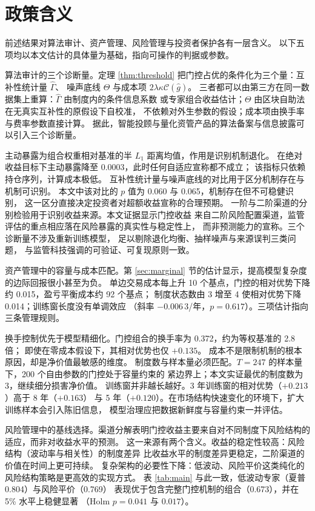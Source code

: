 \section{政策含义}
\label{sec:policy}

前述结果对算法审计、资产管理、风险管理与投资者保护各有一层含义。
以下五项均以本文估计的具体量为基础，指向可操作的判据或参数。

算法审计的三个诊断量。定理 \ref{thm:threshold} 把门控占优的条件化为三个量：互补性统计量 $\hat\Gamma$、
噪声底线 $\Theta$ 与成本项 $2\lambda\kappa\mathcal{C}(\hat g)$。
三者都可以由第三方在同一数据集上重算：$\hat\Gamma$ 由制度内的条件信息系数
或专家组合收益估计；$\Theta$ 由区块自助法在无真实互补性的原假设下自校准，
不依赖对外生参数的假设；成本项由换手率与费率参数直接计算。
据此，智能投顾与量化资管产品的算法备案与信息披露可以引入三个诊断量。

主动暴露为组合权重相对基准的半 $L_1$ 距离均值，作用是识别机制退化。
在绝对收益目标下主动暴露降至 $0.0003$，此时任何自适应宣称都不成立；
该指标只依赖持仓序列，计算成本极低。
互补性统计量与噪声底线的对比用于区分机制存在与机制可识别。
本文中该对比的 $p$ 值为 0.060 与 0.065，机制存在但不可稳健识别，
这一区分直接决定投资者对超额收益宣称的合理预期。
一阶与二阶渠道的分别检验用于识别收益来源。本文证据显示门控收益
来自二阶风险配置渠道，监管评估的重点相应落在风险暴露的真实性与稳定性上，
而非预测能力的宣称。三个诊断量不涉及重新训练模型，
足以剔除退化均衡、抽样噪声与来源误判三类问题，
与监管科技强调的可验证、可复现原则一致\cite{chakraborty2017,bis2024aer}。

资产管理中的容量与成本匹配。第 \ref{sec:marginal} 节的估计显示，提高模型复杂度的边际回报很小甚至为负。
单边交易成本每上升 10 个基点，门控的相对优势下降约 0.015，盈亏平衡成本约 92 个基点；
制度状态数由 3 增至 4 使相对优势下降 0.014；训练窗长度没有单调效应
（斜率 $-0.006\,3$/年，$p=0.617$）。三项估计指向三条管理规则。

换手控制优先于模型精细化。门控组合的换手率为 0.372，约为等权基准的 2.8 倍；
即使在零成本假设下，其相对优势也仅 $+0.135$。
成本不是限制机制的根本原因，却是净价值最敏感的维度。
制度数与样本量必须匹配。$T=247$ 的样本量下，200 个自由参数的门控处于容量约束的
紧边界上；本文实证最优的制度数为 3，继续细分损害净价值。
训练窗并非越长越好。3 年训练窗的相对优势（$+0.213$）高于 8 年（$+0.163$）
与 5 年（$+0.120$）。在市场结构快速变化的环境下，扩大训练样本会引入陈旧信息，
模型治理应把数据新鲜度与容量约束一并评估。

风险管理中的基线选择。渠道分解表明门控收益主要来自对不同制度下风险结构的适应，而非对收益水平的预测。
这一来源有两个含义。收益的稳定性较高：风险结构（波动率与相关性）的制度差异
比收益水平的制度差异更稳定，二阶渠道的价值在时间上更可持续。
复杂架构的必要性下降：低波动、风险平价这类纯化的风险结构策略是更高效的实现方式。
表 \ref{tab:main} 与此一致，低波动专家（夏普 0.804）与风险平价（0.769）
表现优于包含完整门控机制的组合（0.673），并在 5\% 水平上稳健显著
（Holm $p=0.041$ 与 $0.017$）。

